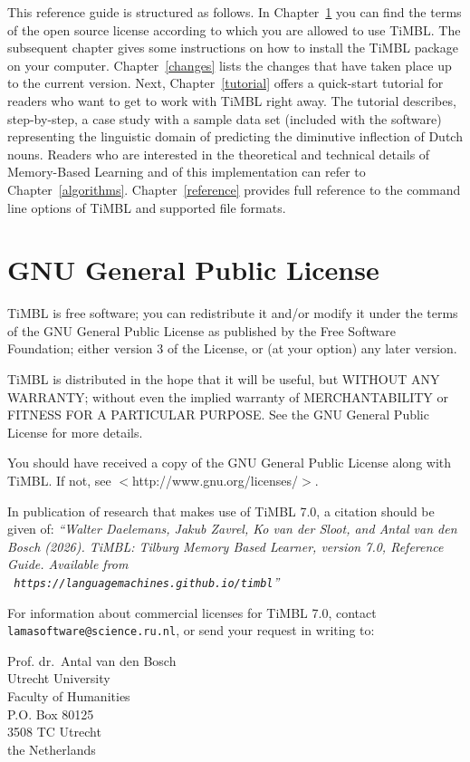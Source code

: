 \documentclass{book}
\begin{document}
This reference guide is structured as follows. In
Chapter~\ref{license} you can find the terms of the open source
license according to which you are allowed to use TiMBL. The
subsequent chapter gives some instructions on how to install the TiMBL
package on your computer. Chapter~\ref{changes} lists the changes that
have taken place up to the current version. Next,
Chapter~\ref{tutorial} offers a quick-start tutorial for readers who
want to get to work with TiMBL right away. The tutorial describes,
step-by-step, a case study with a sample data set (included with the
software) representing the linguistic domain of predicting the
diminutive inflection of Dutch nouns.  Readers who are interested in
the theoretical and technical details of Memory-Based Learning and of
this implementation can refer to
Chapter~\ref{algorithms}. Chapter~\ref{reference} provides full
reference to the command line options of TiMBL and supported file
formats.

\chapter{GNU General Public License}
\label{license}

TiMBL is free software; you can redistribute it and/or modify it under
the terms of the GNU General Public License as published by the Free
Software Foundation; either version 3 of the License, or (at your
option) any later version.

TiMBL is distributed in the hope that it will be useful, but WITHOUT
ANY WARRANTY; without even the implied warranty of MERCHANTABILITY or
FITNESS FOR A PARTICULAR PURPOSE.  See the GNU General Public License
for more details.

You should have received a copy of the GNU General Public License
along with TiMBL.  If not, see $<$http://www.gnu.org/licenses/$>$.

In publication of research that makes use of TiMBL 7.0, a citation
should be given of: {\em ``Walter Daelemans, Jakub Zavrel, Ko van der
  Sloot, and Antal van den Bosch (2026). TiMBL: Tilburg Memory Based
  Learner, version 7.0, Reference Guide.
  Available from \\ {\tt
    https://languagemachines.github.io/timbl}''}

For information about commercial licenses for TiMBL 7.0,
contact {\tt lamasoftware@science.ru.nl}, or send your request in writing to:

Prof. dr.~Antal van den Bosch\\
Utrecht University\\
Faculty of Humanities\\
P.O. Box 80125\\
3508 TC Utrecht\\
the Netherlands
\end{document}
